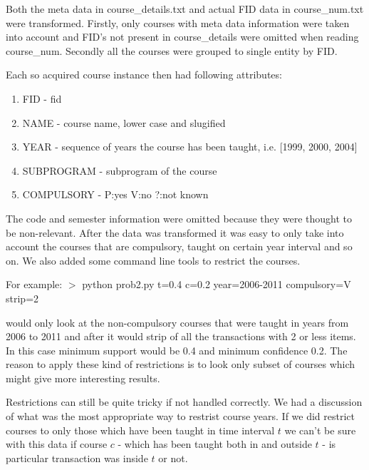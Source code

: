 Both the meta data in course\_details.txt and actual FID data in course\_num.txt were transformed.
Firstly, only courses with meta data information were taken into account and FID's not present in
course\_details were omitted when reading course\_num. Secondly all the courses were grouped 
to single entity by FID. 

Each so acquired course instance then had following attributes:
\begin{enumerate}
\item FID - fid
\item NAME - course name, lower case and slugified
\item YEAR - sequence of years the course has been taught, i.e. [1999, 2000, 2004]
\item SUBPROGRAM - subprogram of the course
\item COMPULSORY - P:yes V:no ?:not known
\end{enumerate}

The code and semester information were omitted because they were thought to be non-relevant.
After the data was transformed it was easy to only take into account the courses that are
compulsory, taught on certain year interval and so on. We also added some command line tools to restrict the courses. 
\newline

For example:\newline
$>$ python prob2.py t=0.4 c=0.2 year=2006-2011 compulsory=V strip=2
\newline

would only look at the non-compulsory courses that were taught in years from 2006 to 2011 and 
after it would strip of all the transactions with 2 or less items.  In this case minimum support would be
0.4 and minimum confidence 0.2. The reason to apply these kind of restrictions is to look only 
subset of courses which might give more interesting results.
\newline


Restrictions can still be quite tricky if not handled correctly. We had a discussion of what was the most appropriate way to  
restrist course years. If we
did restrict courses to only those which have been taught in time interval $t$ we can't be sure with this
data if course $c$ - which has been taught both in and outside $t$ - is particular transaction was inside $t$ or not. 

